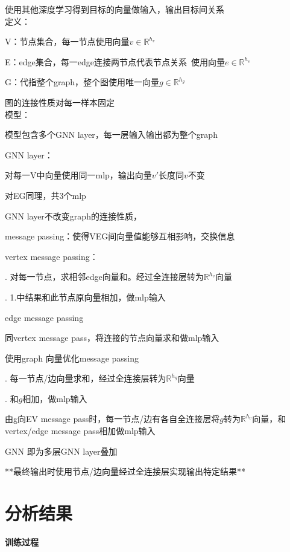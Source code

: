 \documentclass[UTF8]{ctexart}
\begin{document}
  使用其他深度学习得到目标的向量做输入，输出目标间关系\\
定义：

  V：节点集合，每一节点使用向量$v \in \mathbb{R}^{h_v}$

  E：edge集合，每一edge连接两节点代表节点关系\ 使用向量$e \in \mathbb{R}^{h_e}$

  G：代指整个graph，整个图使用唯一向量$g \in \mathbb{R}^{h_g}$
  
  图的连接性质对每一样本固定\\
模型：

  模型包含多个GNN layer，每一层输入输出都为整个graph

  GNN layer：

  \quad 对每一V中向量使用同一mlp，输出向量$v'$长度同$v$不变

  \quad 对EG同理，共3个mlp

  \quad GNN layer不改变graph的连接性质，

  \quad message passing：使得VEG间向量值能够互相影响，交换信息

  \quad \quad vertex message passing：

  \quad \quad {}. 对每一节点，求相邻edge向量和。经过全连接层转为$\mathbb{R}^{h_v}$向量

  \quad \quad {}. 1.中结果和此节点原向量相加，做mlp输入

  \quad \quad edge message passing

  \quad \quad \quad 同vertex message pass，将连接的节点向量求和做mlp输入

  \quad \quad 使用graph 向量优化message passing

  \quad \quad {}. 每一节点/边向量求和，经过全连接层转为$\mathbb{R}^{h_g}$向量

  \quad \quad {}. 和$g$相加，做mlp输入 

  \quad \quad \quad 由g向EV message pass时，每一节点/边有各自全连接层将$g$转为$\mathbb{R}^{h_v}$向量，和vertex/edge message pass相加做mlp输入

  GNN 即为多层GNN layer叠加

  **最终输出时使用节点/边向量经过全连接层实现输出特定结果**
  
\section{分析结果}
\noindent \textbf{训练过程}
\end{document}
